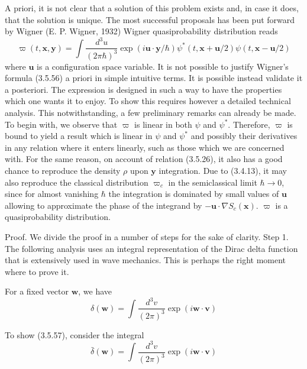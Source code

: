 \documentclass{article}
\begin{document}
A priori, it is not clear that a solution of this problem exists and, in case it does, that the solution is unique. The most successful proposals has been put forward by Wigner (E. P. Wigner, 1932) Wigner quasiprobability distribution reads
$$
\begin{equation*}
\varpi(t, \boldsymbol{x}, \boldsymbol{y})=\int \frac{d^{3} u}{(2 \pi \hbar)^{3}} \exp (i \boldsymbol{u} \cdot \boldsymbol{y} / \hbar) \psi^{*}(t, \boldsymbol{x}+\boldsymbol{u} / 2) \psi(t, \boldsymbol{x}-\boldsymbol{u} / 2) \tag{3.5.56}
\end{equation*}
$$
where $\boldsymbol{u}$ is a configuration space variable. It is not possible to justify Wigner's formula (3.5.56) a priori in simple intuitive terms. It is possible instead validate it a posteriori. The expression is designed in such a way to have the properties which one wants it to enjoy. To show this requires however a detailed technical analysis. This notwithstanding, a few preliminary remarks can already be made. To begin with, we observe that $\varpi$ is linear in both $\psi$ and $\psi^{*}$. Therefore, $\varpi$ is bound to yield a result which is linear in $\psi$ and $\psi^{*}$ and possibly their derivatives
in any relation where it enters linearly, such as those which we are concerned with. For the same reason, on account of relation (3.5.26), it also has a good chance to reproduce the density $\rho$ upon $\boldsymbol{y}$ integration. Due to (3.4.13), it may also reproduce the classical distribution $\varpi_{c}$ in the semiclassical limit $\hbar \rightarrow 0$, since for almost vanishing $\hbar$ the integration is dominated by small values of $\boldsymbol{u}$ allowing to approximate the phase of the integrand by $-\boldsymbol{u} \cdot \nabla S_{c}(\boldsymbol{x})$.
$\varpi$ is a quasiprobability distribution.

Proof. We divide the proof in a number of steps for the sake of clarity.
Step 1. The following analysis uses an integral representation of the Dirac delta function that is extensively used in wave mechanics. This is perhaps the right moment where to prove it.

For a fixed vector $\boldsymbol{w}$, we have
$$
\begin{equation*}
\delta(\boldsymbol{w})=\int \frac{d^{3} v}{(2 \pi)^{3}} \exp (i \boldsymbol{w} \cdot \boldsymbol{v}) \tag{3.5.57}
\end{equation*}
$$

To show (3.5.57), consider the integral
$$
\begin{equation*}
\bar{\delta}(\boldsymbol{w})=\int \frac{d^{3} v}{(2 \pi)^{3}} \exp (i \boldsymbol{w} \cdot \boldsymbol{v}) \tag{3.5.58}
\end{equation*}
$$
\end{document}
